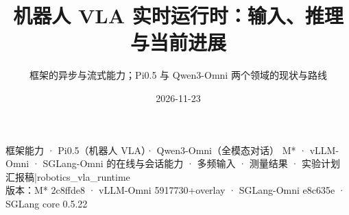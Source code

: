 \documentclass[aspectratio=169,10pt]{beamer}
\title{机器人 VLA 实时运行时：输入、推理与当前进展}
\subtitle{框架的异步与流式能力；Pi0.5 与 Qwen3-Omni 两个领域的现状与路线}
\date{2026-11-23}
\begin{document}
%
  {框架能力 · Pi0.5（机器人 VLA）· Qwen3-Omni（全模态对话）}%
  {M* · vLLM-Omni · SGLang-Omni 的在线与会话能力 · 多频输入 · 测量结果 · 实验计划}%
  {汇报稿\quad|\quad robotics\_vla\_runtime\\版本：M* 2c8ffde8 · vLLM-Omni 5917730+overlay · SGLang-Omni e8c635e · SGLang core 0.5.22}















\end{document}
